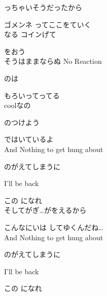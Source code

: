 {っちゃいそうだったから

ゴメンネ ってここをていく
\\

なる コインげて

をおう
\\

そうはままならぬ No Reaction

 のは

もろいってってる
\\

coolなの

のつけよう

ではいているよ
\\

And Nothing to get hung about

のがえてしまうに

I'll be back

この になれ
\\

そしてがぎ…がをえるから

こんなにいは してゆくんだね…
\\

And Nothing to get hung about

のがえてしまうに

I'll be back

この になれ

}